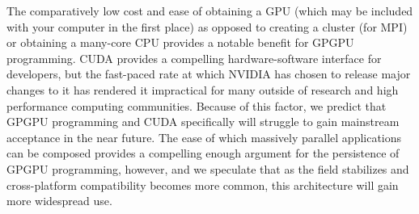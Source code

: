 \documentclass[12pt]{article}
\begin{document}
The comparatively low cost and ease of obtaining a GPU (which may be included with your computer in the first place) as opposed to creating a cluster (for MPI) or obtaining a many-core CPU provides a notable benefit for GPGPU programming. CUDA provides a compelling hardware-software interface for developers, but the fast-paced rate at which NVIDIA has chosen to release major changes to it has rendered it impractical for many outside of research and high performance computing communities. Because of this factor, we predict that GPGPU programming and CUDA specifically will struggle to gain mainstream acceptance in the near future. The ease of which massively parallel applications can be composed provides a compelling enough argument for the persistence of GPGPU programming, however, and we speculate that as the field stabilizes and cross-platform compatibility becomes more common, this architecture will gain more widespread use.
\end{document}
